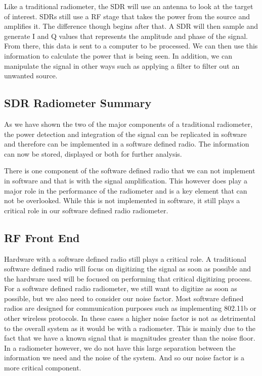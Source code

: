 Like a traditional radiometer, the SDR will use an antenna to look at the target of interest.  SDRs still use a RF stage that takes the power from the source and amplifies it.  The difference though begins after that.  A SDR will then sample and generate I and Q values that represents the amplitude and phase of the signal.  From there, this data is sent to a computer to be processed.  We can then use this information to calculate the power that is being seen.  In addition, we can manipulate the signal in other ways such as applying a filter to filter out an unwanted source.

\subsection{SDR Radiometer Summary}

As we have shown the two of the major components of a traditional radiometer, the power detection and integration of the signal can be replicated in software and therefore can be implemented in a software defined radio.  The information can now be stored, displayed or both for further analysis.  

There is one component of the software defined radio that we can not implement in software and that is with the signal amplification.  This however does play a major role in the performance of the radiometer and is a key element that can not be overlooked.  While this is not implemented in software, it still plays a critical role in our software defined radio radiometer. 

\subsection{RF Front End}

Hardware with a software defined radio still plays a critical role.  A traditional software defined radio will focus on digitizing the signal as soon as possible and the hardware used will be focused on performing that critical digitizing process.  For a software defined radio radiometer, we still want to digitize as soon as possible, but we also need to consider our noise factor.  Most software defined radios are designed for communication purposes such as implementing 802.11b or other wireless protocols.  In these cases a higher noise factor is not as detrimental to the overall system as it would be with a radiometer.  This is mainly due to the fact that we have a known signal that is magnitudes greater than the noise floor.  In a radiometer however, we do not have this large separation between the information we need and the noise of the system.  And so our noise factor is a more critical component.  

